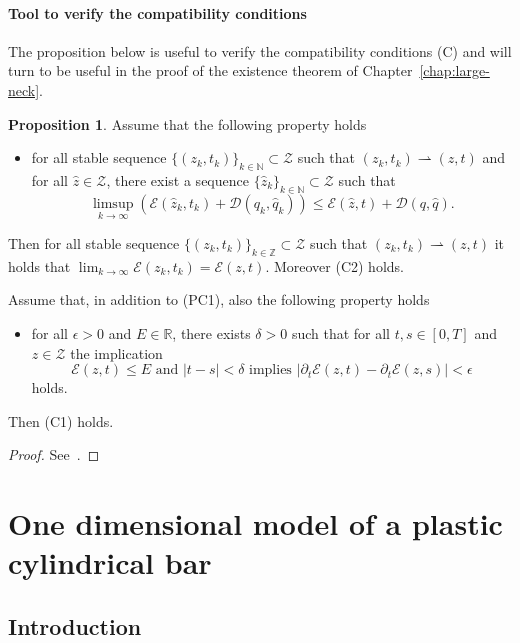 \documentclass[a4paper,10pt,twoside]{amsbook}
\numberwithin{section}{chapter}
\numberwithin{equation}{chapter}
\theoremstyle{definition}
\newtheorem{prop}{Proposition}[chapter]
\begin{document}
\subsection{Tool to verify the compatibility conditions}

The proposition below is useful to verify the compatibility conditions (C) and will turn to be useful in the proof of the existence theorem of Chapter~\ref{chap:large-neck}. 
\begin{prop}
\label{prop:tool-verify-compatibility}
Assume that the following property holds
\begin{itemize}
\item[(PC1)] for all stable sequence $\{(z_k,t_k)\}_{k\in\mathbb{N}}\subset\mathscr{Z}$ such that $(z_k,t_k)\rightharpoonup(z,t)$ and for all $\hat{z}\in\mathscr{Z}$, there exist a sequence $\{\hat{z}_k\}_{k\in\mathbb{N}}\subset\mathscr{Z}$ such that
\[
\limsup_{k\to\infty}\left(\mathcal{E}(\hat{z}_k,t_k)+\mathcal{D}(q_k,\hat{q}_k)\right)\le\mathcal{E}(\hat{z},t)+\mathcal{D}(q,\hat{q}).
\]
\end{itemize}
Then for all stable sequence $\{(z_k,t_k)\}_{k\in\mathbb{Z}}\subset\mathscr{Z}$ such that $(z_k,t_k)\rightharpoonup(z,t)$ it holds that $\lim_{k\to\infty}\mathcal{E}(z_k,t_k)=\mathcal{E}(z,t)$. Moreover (C2) holds.

Assume that, in addition to (PC1), also the following property holds
\begin{itemize}
\item[(PC2)] for all $\epsilon>0$ and $E\in\mathbb{R}$, there exists $\delta>0$ such that for all $t,s\in[0,T]$ and $z\in\mathscr{Z}$ the implication
\begin{equation}
\text{$\mathcal{E}(z,t)\le E$ and $|t-s|<\delta$ implies $|\partial_t\mathcal{E}(z,t)-\partial_t\mathcal{E}(z,s)|<\epsilon$}
\end{equation}
holds.
\end{itemize}
Then (C1) holds.
\end{prop}
\begin{proof}
See~\cite{francfort}.
\end{proof}

%

\part{One dimensional model of a plastic cylindrical bar}
\label{part:his-model}

\chapter{Introduction}
\label{chap:intro-neck}
\end{document}
